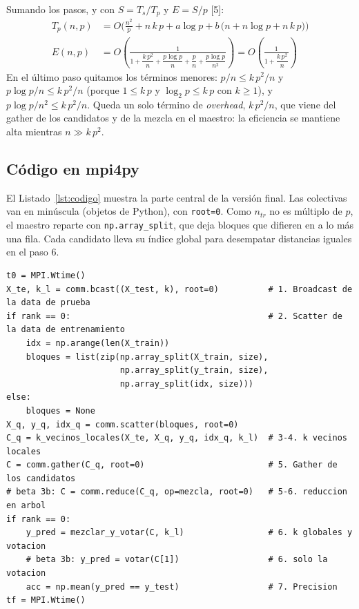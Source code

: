 \documentclass[11pt,a4paper]{article}
\newcommand{\ntr}{n_{tr}}
\begin{document}
Sumando los pasos, y con $S = T_s/T_p$ y $E = S/p$ [5]:
\begin{align*}
T_p(n,p) &= O\Big(\frac{n^2}{p} + n\, k\, p + a\log p + b\,\big(n + n \log p + n\, k\, p\big)\Big)\\
E(n,p) &= O\left(\frac{1}{1 + \dfrac{k\,p^2}{n} + \dfrac{p \log p}{n} + \dfrac{p}{n} + \dfrac{p\log p}{n^2}}\right)
 = O\left(\frac{1}{1 + \dfrac{k\,p^2}{n}}\right)
\end{align*}
En el último paso quitamos los términos menores: $p/n \le k\,p^2/n$ y $p\log p/n \le k\,p^2/n$ (porque $1 \le k\,p$ y $\log_2 p \le k\,p$ con $k \ge 1$), y $p\log p/n^2 \le k\,p^2/n$. Queda un solo término de \textit{overhead}, $k\,p^2/n$, que viene del gather de los candidatos y de la mezcla en el maestro: la eficiencia se mantiene alta mientras $n \gg k\,p^2$.

\subsection{Código en mpi4py}

El Listado~\ref{lst:codigo} muestra la parte central de la versión final. Las colectivas van en minúscula (objetos de Python), con \texttt{root=0}. Como $\ntr$ no es múltiplo de $p$, el maestro reparte con \texttt{np.array\_split}, que deja bloques que difieren en a lo más una fila. Cada candidato lleva su índice global para desempatar distancias iguales en el paso 6.

\begin{lstlisting}[float=!htb, caption={Parte central de \texttt{knn\_mpi\_beta3.py} simplificada: sin las barreras ni las marcas de tiempo intermedias de la medición (los pasos corresponden al Algoritmo~\ref{alg:knn}).}, label={lst:codigo}]
t0 = MPI.Wtime()
X_te, k_l = comm.bcast((X_test, k), root=0)          # 1. Broadcast de la data de prueba
if rank == 0:                                        # 2. Scatter de la data de entrenamiento
    idx = np.arange(len(X_train))
    bloques = list(zip(np.array_split(X_train, size),
                       np.array_split(y_train, size),
                       np.array_split(idx, size)))
else:
    bloques = None
X_q, y_q, idx_q = comm.scatter(bloques, root=0)
C_q = k_vecinos_locales(X_te, X_q, y_q, idx_q, k_l)  # 3-4. k vecinos locales
C = comm.gather(C_q, root=0)                         # 5. Gather de los candidatos
# beta 3b: C = comm.reduce(C_q, op=mezcla, root=0)   # 5-6. reduccion en arbol
if rank == 0:
    y_pred = mezclar_y_votar(C, k_l)                 # 6. k globales y votacion
    # beta 3b: y_pred = votar(C[1])                  # 6. solo la votacion
    acc = np.mean(y_pred == y_test)                  # 7. Precision
tf = MPI.Wtime()
\end{lstlisting}
\end{document}

